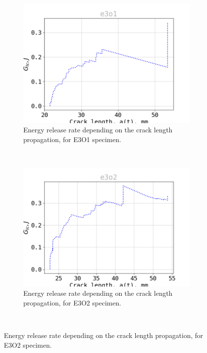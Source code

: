 \begin{figure}[H]
\centering
\begin{subfigure}{0.48\linewidth}
	\centering
	\includegraphics[scale=0.3]{Figures/e3o1_G}
	\decoRule
	\caption[Energy release rate E3O1]{Energy release rate depending on the crack length propagation, for E3O1 specimen.}
	\label{fig:E3O1_G}
\end{subfigure}
\hfill\\
\begin{subfigure}{0.48\linewidth}
	\centering
	\includegraphics[scale=0.3]{Figures/e3o2_G}
	\decoRule
	\caption[Energy release rate E3O2]{Energy release rate depending on the crack length propagation, for E3O2 specimen.}
	\label{fig:E3O2_G}
\end{subfigure}
\hfill\\

\end{figure}
